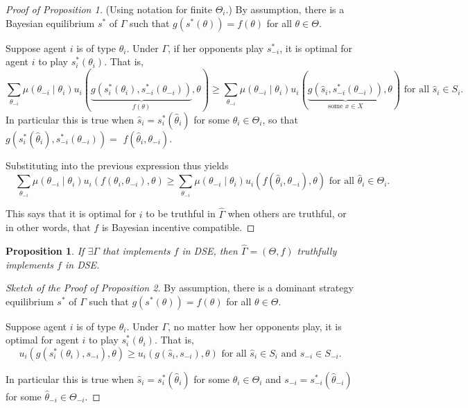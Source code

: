 \documentclass[11pt,leqno]{article}
\newtheorem{proposition}{Proposition}
\begin{document}
	\begin{proof}[Proof of Proposition 1] (Using notation for finite $\Theta_i$.) By assumption, there is a Bayesian equilibrium $s^*$ of $\Gamma$ such that $g\left(s^*(\theta)\right)=f(\theta)$ for all $\theta \in \Theta$.
		
		Suppose agent $i$ is of type $\theta_i$. Under $\Gamma$, if her opponents play $s_{-i}^*$, it is optimal for agent $i$ to play $s_i^*\left(\theta_i\right)$. That is,
		$$
		\sum_{\theta_{-i}} \mu\left(\theta_{-i} \mid \theta_i\right) u_i(\underbrace{g\left(s_i^*\left(\theta_i\right), s_{-i}^*\left(\theta_{-i}\right)\right)}_{f(\theta)}, \theta) \geq \sum_{\theta_{-i}} \mu\left(\theta_{-i} \mid \theta_i\right) u_i(\underbrace{g\left(\hat{s}_i, s_{-i}^*\left(\theta_{-i}\right)\right)}_{\text {some } x \in X}, \theta) \text { for all } \hat{s}_i \in S_i .
		$$
		In particular this is true when $\hat{s}_i=s_i^*\left(\hat{\theta}_i\right)$ for some $\hat{\theta}_i \in \Theta_i$, so that $g\left(s_i^*\left(\hat{\theta}_i\right), s_{-i}^*\left(\theta_{-i}\right)\right)=$ $f\left(\hat{\theta}_i, \theta_{-i}\right)$. 
		
		Substituting into the previous expression thus yields
		$$\quad \sum_{\theta_{-i}} \mu\left(\theta_{-i} \mid \theta_i\right) u_i\left(f\left(\theta_i, \theta_{-i}\right), \theta\right) \geq \sum_{\theta_{-i}} \mu\left(\theta_{-i} \mid \theta_i\right) u_i\left(f\left(\hat{\theta}_i, \theta_{-i}\right), \theta\right)\text { for all } \hat{\theta}_i \in \Theta_i.$$ 
		
		This says that it is optimal for $i$ to be truthful in $\hat{\Gamma}$ when others are truthful, or in other words, that $f$ is Bayesian incentive compatible.
	\end{proof}
	
	\begin{proposition}
		If $\exists \Gamma$ that implements $f$ in DSE, then $\hat{\Gamma}=(\Theta,f)$ truthfully implements $f$ in DSE.
	\end{proposition}
	
	\begin{proof}[Sketch of the Proof of Proposition 2] By assumption, there is a dominant strategy equilibrium $s^*$ of $\Gamma$ such that $g\left(s^*(\theta)\right)=f(\theta)$ for all $\theta \in \Theta$.
		
		Suppose agent $i$ is of type $\theta_i$. Under $\Gamma$, no matter how her opponents play, it is optimal for agent $i$ to play $s_i^*\left(\theta_i\right)$. That is,
		$$
		u_i(g\left(s_i^*\left(\theta_i\right), s_{-i}\right), \theta) \geq u_i(g\left(\hat{s}_i, s_{-i}\right), \theta) \text { for all } \hat{s}_i \in S_i \text{ and } s_{-i}\in S_{-i}.
		$$
		
		In particular this is true when $\hat{s}_i=s_i^*\left(\hat{\theta}_i\right)$ for some $\hat{\theta}_i \in \Theta_i$ and $s_{-i}=s_{-i}^*\left(\hat{\theta}_{-i}\right)$ for some $\hat{\theta}_{-i} \in \Theta_{-i}$. 
	\end{proof}
	
\end{document}
